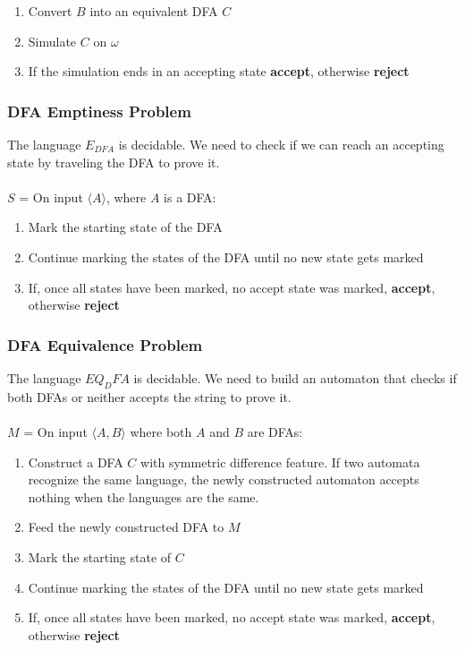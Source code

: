 \documentclass{article}
\begin{document}
\begin{enumerate}
	\item Convert $B$ into an equivalent DFA $C$
	\item Simulate $C$ on $\omega$
	\item If the simulation ends in an accepting state \textbf{accept}, otherwise \textbf{reject}
\end{enumerate}

\subsubsection{DFA Emptiness Problem}
The language $E_{DFA}$ is decidable. We need to check if we can reach an accepting state by traveling the DFA to prove it. \\ \\
$S$ = On input $\langle A \rangle$, where $A$ is a DFA:

\begin{enumerate}
	\item Mark the starting state of the DFA
	\item Continue marking the states of the DFA until no new state gets marked
	\item If, once all states have been marked, no accept state was marked, \textbf{accept}, otherwise \textbf{reject}
\end{enumerate}

\subsubsection{DFA Equivalence Problem}
The language $EQ_DFA$ is decidable. We need to build an automaton that checks if both DFAs or neither accepts the string to prove it. \\ \\
$M$ = On input $\langle A, B \rangle$ where both $A$ and $B$ are DFAs:

\begin{enumerate}
	\item Construct a DFA $C$ with symmetric difference feature. If two automata recognize the same language, the newly constructed automaton accepts nothing when the languages are the same.
	\item Feed the newly constructed DFA to $M$
	\item Mark the starting state of $C$
	\item Continue marking the states of the DFA until no new state gets marked
	\item If, once all states have been marked, no accept state was marked, \textbf{accept}, otherwise \textbf{reject}
\end{enumerate}
\end{document}
